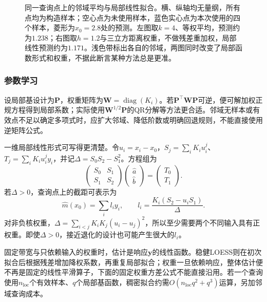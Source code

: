 \begin{figure}[htbp]
  \centering
  
  \caption{同一查询点上的邻域平均与局部线性拟合。横、纵轴均无量纲，所有点均为构造样本；空心点为未使用样本，蓝色实心点为本次使用的四个样本，菱形为$x_0=2.8$处的预测。左图取$k=4$、等权平均，预测约为$1.238$；右图取$h=1.2$与三立方距离权重，不做残差重加权，局部线性预测约为$1.171$。浅色带标出各自的邻域，两图同时改变了局部函数形式和权重，不据此断言某种方法总是更准。}
  \label{fig:regression-neighborhood}
\end{figure}

\subsubsection{参数学习}

设局部基设计为$\bm{P}$，权重矩阵为$\bm{W}=\operatorname{diag}(K_i)$。若$\bm{P}^{\top}\bm{W}\bm{P}$可逆，便可解加权正规方程得到局部系数；实际使用$\bm{W}^{1/2}\bm{P}$的QR分解等方法更合适。邻域无样本或有效点不足以确定多项式时，应扩大邻域、降低阶数或明确回退规则，不能直接使用逆矩阵公式。

一维局部线性形式可写得更清楚。令$u_i=x_i-x_0$，$S_j=\sum_iK_iu_i^j$、$T_j=\sum_iK_iu_i^jy_i$，并记$\Delta=S_0S_2-S_1^2$。方程组为
\[
  \begin{pmatrix}S_0&S_1\\S_1&S_2\end{pmatrix}
  \begin{pmatrix}\widehat a\\\widehat b\end{pmatrix}
  =\begin{pmatrix}T_0\\T_1\end{pmatrix}.
\]
若$\Delta>0$，查询点上的截距可表示为
\begin{equation}
  \widehat m(x_0)=\sum_i l_i y_i,\qquad
  l_i=\frac{K_i(S_2-u_iS_1)}{\Delta}.
  \label{eq:regression-local-linear-weights}
\end{equation}
对非负核权重，$\Delta=\sum_{i<j}K_iK_j(u_i-u_j)^2$，所以至少需要两个不同输入具有正权重。即使$\Delta>0$，接近退化的设计也可能产生很大的$l_i$。

固定带宽与只依赖输入的权重时，估计是响应$\bm{y}$的线性函数。稳健LOESS则在初次拟合后根据残差增加降权系数，再重复局部拟合；权重一旦依赖响应，整体估计便不再是固定的线性平滑算子，下面的固定权重方差公式不能直接沿用。若一个查询使用$n_{\mathrm{loc}}$个有效样本、$q$个局部基函数，稠密拟合约需$O(n_{\mathrm{loc}}q^2+q^3)$运算，另加邻域查询成本。


